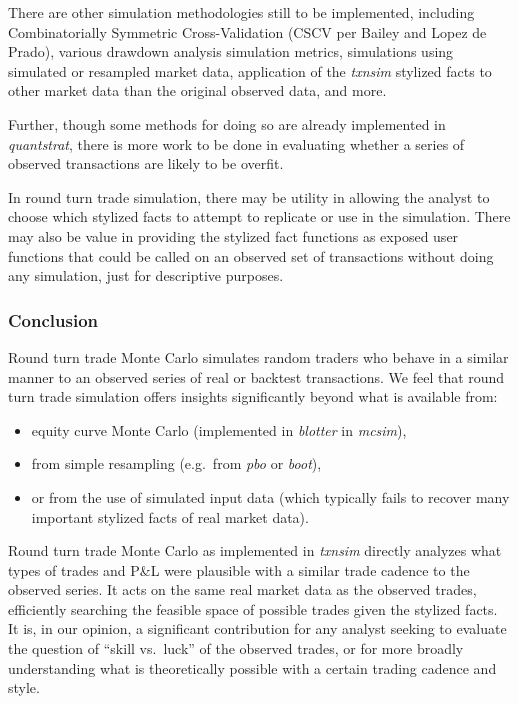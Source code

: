 There are other simulation methodologies still to be implemented,
including Combinatorially Symmetric Cross-Validation (CSCV per Bailey
and Lopez de Prado), various drawdown analysis simulation metrics,
simulations using simulated or resampled market data, application of the
\emph{txnsim} stylized facts to other market data than the original
observed data, and more.

Further, though some methods for doing so are already implemented in
\emph{quantstrat}, there is more work to be done in evaluating whether a
series of observed transactions are likely to be overfit.

In round turn trade simulation, there may be utility in allowing the
analyst to choose which stylized facts to attempt to replicate or use in
the simulation. There may also be value in providing the stylized fact
functions as exposed user functions that could be called on an observed
set of transactions without doing any simulation, just for descriptive
purposes.

\hypertarget{conclusion}{%
\subsubsection{Conclusion}\label{conclusion}}

Round turn trade Monte Carlo simulates random traders who behave in a
similar manner to an observed series of real or backtest transactions.
We feel that round turn trade simulation offers insights significantly
beyond what is available from:

\begin{itemize}
\tightlist
\item
  equity curve Monte Carlo (implemented in \emph{blotter} in
  \emph{mcsim}),
\item
  from simple resampling (e.g.~from \emph{pbo} or \emph{boot}),
\item
  or from the use of simulated input data (which typically fails to
  recover many important stylized facts of real market data).
\end{itemize}

Round turn trade Monte Carlo as implemented in \emph{txnsim} directly
analyzes what types of trades and P\&L were plausible with a similar
trade cadence to the observed series. It acts on the same real market
data as the observed trades, efficiently searching the feasible space of
possible trades given the stylized facts. It is, in our opinion, a
significant contribution for any analyst seeking to evaluate the
question of ``skill vs.~luck'' of the observed trades, or for more
broadly understanding what is theoretically possible with a certain
trading cadence and style.

